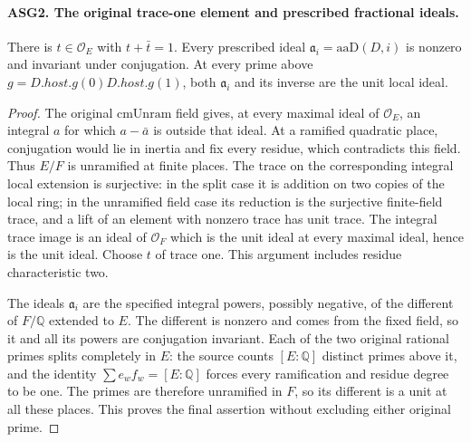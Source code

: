 \paragraph{ASG2. The original trace-one element and prescribed fractional ideals.}
\label{claim:ASG2}
There is \(t\in\mathcal O_E\) with \(t+\bar t=1\).
Every prescribed ideal
\(\mathfrak a_i=\mathrm{aaD}(D,i)\) is nonzero and invariant
under conjugation.  At every prime above
\(g=D.host.g(0)D.host.g(1)\), both \(\mathfrak a_i\) and its
inverse are the unit local ideal.
\begin{proof}
The original \(\mathrm{cmUnram}\) field gives, at every maximal
ideal of \(\mathcal O_E\), an integral \(a\) for which
\(a-\bar a\) is outside that ideal.  At a ramified quadratic
place, conjugation would lie in inertia and fix every residue, which
contradicts this field.  Thus \(E/F\) is unramified at finite
places.  The trace on the corresponding integral local extension is
surjective: in the split case it is addition on two copies of the local
ring; in the unramified field case its reduction is the surjective
finite-field trace, and a lift of an element with nonzero trace has
unit trace.  The integral trace image is an ideal of \(\mathcal O_F\)
which is the unit ideal at every maximal ideal, hence is the unit ideal.
Choose \(t\) of trace one.  This argument includes residue
characteristic two.

The ideals \(\mathfrak a_i\) are the specified integral powers,
possibly negative, of the different of \(F/\mathbb Q\) extended
to \(E\).  The different is nonzero and comes from the fixed
field, so it and all its powers are conjugation invariant.
Each of the two original rational primes splits completely in \(E\):
the source counts \([E:\mathbb Q]\) distinct primes above it,
and the identity \(\sum e_w f_w=[E:\mathbb Q]\) forces every
ramification and residue degree to be one.  The primes are therefore
unramified in \(F\), so its different is a unit at all these
places.  This proves the final assertion without excluding either
original prime.
\end{proof}

